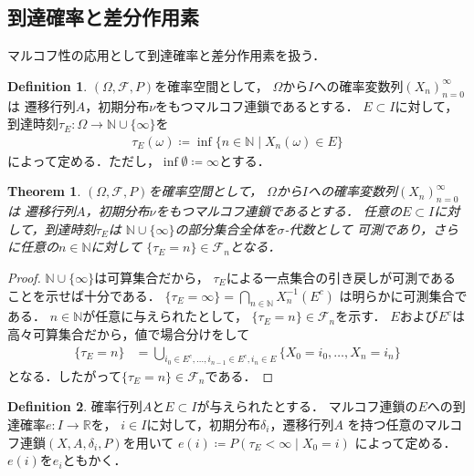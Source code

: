 \documentclass[dvipdfmx,autodetect-engine]{jsarticle}
\newtheorem{theorem}{Theorem}[section]
\theoremstyle{remark}
\theoremstyle{definition}
\newtheorem{definition}{Definition}[section]
\newcommand{\R}{\mathbb{R}}
\newcommand{\N}{\mathbb{N}}
\begin{document}
\subsection{到達確率と差分作用素}
マルコフ性の応用として到達確率と差分作用素を扱う．


\begin{definition}
    $(\Omega,\mathcal{F},P)$を確率空間として，
    $\Omega$から$I$への確率変数列$(X_n)_{n=0}^{\infty}$は
    遷移行列$A$，初期分布$\nu$をもつマルコフ連鎖であるとする．
    $E \subset I$に対して，到達時刻$\tau_{E} \colon \Omega \to \N \cup \{\infty \}$を
    \begin{align}
        \tau_{E}(\omega) \coloneqq \inf\{n \in \N \mid X_n(\omega) \in E\}
    \end{align}
    によって定める．ただし，$\inf \emptyset \coloneqq \infty$とする．
\end{definition}


\begin{theorem}
    $(\Omega,\mathcal{F},P)$を確率空間として，
    $\Omega$から$I$への確率変数列$(X_n)_{n=0}^{\infty}$は
    遷移行列$A$，初期分布$\nu$をもつマルコフ連鎖であるとする．
    任意の$E \subset I$に対して，到達時刻$\tau_{E}$は
    $\N \cup \{\infty \}$の部分集合全体を$\sigma$-代数として
    可測であり，さらに任意の$n \in \N$に対して
    $\{\tau_{E} = n\} \in \mathcal{F}_n$となる．
\end{theorem}

\begin{proof}
    $\N \cup \{ \infty\}$は可算集合だから，
    $\tau_{E}$による一点集合の引き戻しが可測であることを示せば十分である．
    $\{\tau_{E} = \infty \} = \bigcap_{n\in \N} X_n^{-1} (E^{c})$
    は明らかに可測集合である．
    $n \in \N$が任意に与えられたとして，
    $\{\tau_{E} = n \} \in \mathcal{F}_n$を示す．
    $E$および$E^c$は高々可算集合だから，値で場合分けをして
    \begin{align}
        \{\tau_{E} = n\} &= 
        \bigcup_{i_0 \in E^{c} ,\ldots, i_{n-1} \in E^{c},i_n \in E}
        \{X_0 = i_0,\ldots, X_n = i_n\} 
    \end{align}
    となる．したがって$\{\tau_{E} = n\} \in \mathcal{F}_n$である．
\end{proof}


\begin{definition}
    確率行列$A$と$E \subset I$が与えられたとする．
    マルコフ連鎖の$E$への到達確率$e\colon I \to \R$を，
    $i \in I$に対して，初期分布$\delta_i$，遷移行列$A$
    を持つ任意のマルコフ連鎖$(X,A,\delta_{i},P)$を用いて
    $e(i) \coloneqq P(\tau_{E} <\infty \mid X_0=i)$
    によって定める．$e(i)$を$e_i$ともかく．
\end{definition}
\end{document}
